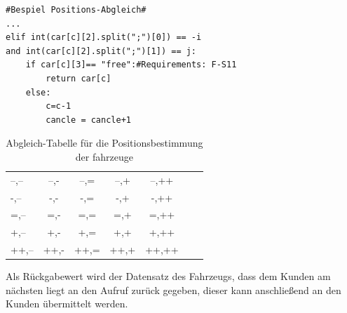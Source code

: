 \documentclass[conference]{IEEEtran}
\begin{document}
\begin{lstlisting}
#Bespiel Positions-Abgleich#
...
elif int(car[c][2].split(";")[0]) == -i 
and int(car[c][2].split(";")[1]) == j:
	if car[c][3]== "free":#Requirements: F-S11
    	return car[c]
    else:
        c=c-1
       	cancle = cancle+1
\end{lstlisting}
\begin{table}[h]
\centering
\label{tab.1}
\caption{Abgleich-Tabelle für die Positionsbestimmung der fahrzeuge}
\begin{tabular}{lcccccr}
--,--&--,-&--,=&--,+&--,++\\
-,--&-,-&-,=&-,+&-,++\\
=,--&=,-&=,=&=,+&=,++\\
+,--&+,-&+,=&+,+&+,++\\
++,--&++,-&++,=&++,+&++,++\\
\end{tabular}
\end{table}
Als Rückgabewert wird der Datensatz des Fahrzeugs, dass dem Kunden am nächsten liegt an den Aufruf zurück gegeben, dieser kann anschließend an den Kunden übermittelt werden. 
\end{document}
